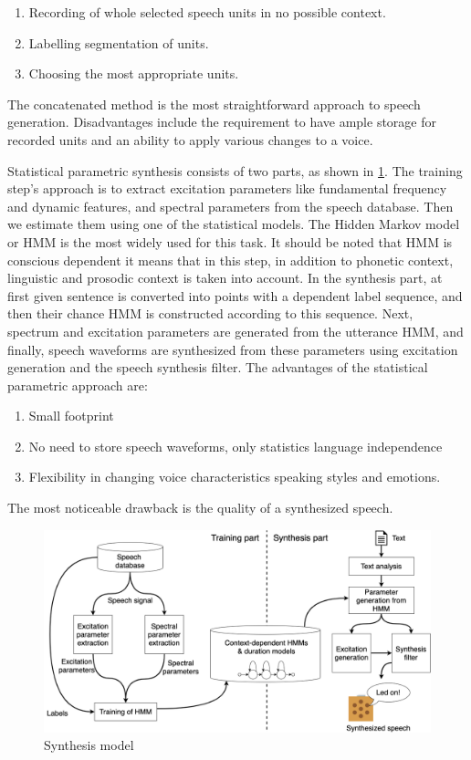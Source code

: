 \begin{enumerate}
    \item Recording of whole selected speech units in no possible context.
    \item Labelling segmentation of units.
    \item Choosing the most appropriate units. 
\end{enumerate}

The concatenated method is the most straightforward approach to speech generation. Disadvantages include the requirement to have ample storage for recorded units and an ability to apply various changes to a voice.

Statistical parametric synthesis consists of two parts, as shown in \cref{fig:synthesis_model}.
The training step's approach is to extract excitation parameters like fundamental frequency and dynamic features, and spectral parameters from the speech database. Then we estimate them using one of the statistical models. The Hidden Markov model or HMM is the most widely used for this task. It should be noted that HMM is conscious dependent it means that in this step, in addition to phonetic context, linguistic and prosodic context is taken into account. In the synthesis part, at first given sentence is converted into points with a dependent label sequence, and then their chance HMM is constructed according to this sequence. Next, spectrum and excitation parameters are generated from the utterance HMM, and finally, speech waveforms are synthesized from these parameters using excitation generation and the speech synthesis filter. The advantages of the statistical parametric approach are:
\begin{enumerate}
    \item Small footprint
    \item No need to store speech waveforms, only statistics language independence
    \item Flexibility in changing voice characteristics speaking styles and emotions. 
\end{enumerate}
The most noticeable drawback is the quality of a synthesized speech.

\begin{figure}[H]
    \centering
    \includegraphics[width=\textwidth]{img/synthesis_model.png}
    \caption{Synthesis model}
    \label{fig:synthesis_model}
\end{figure}


